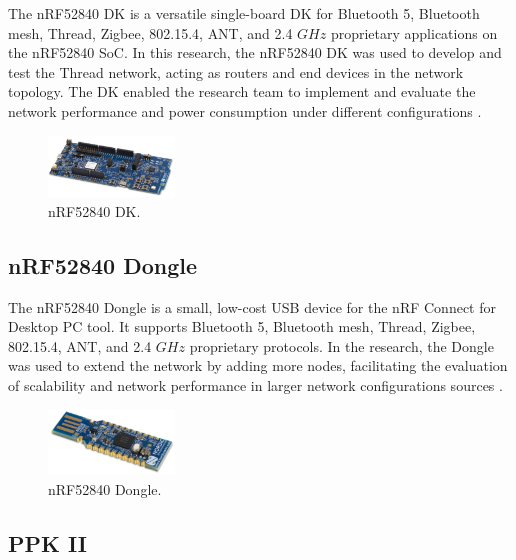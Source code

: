 The nRF52840 \gls{DK} is a versatile single-board \acrlong{DK} for Bluetooth 5, Bluetooth mesh, Thread, Zigbee, 802.15.4, \gls{ANT}, and 2.4 $GHz$ proprietary applications on the nRF52840 \gls{SoC}. In this research, the nRF52840 \gls{DK} was used to develop and test the Thread network, acting as routers and end devices in the network topology. The \acrlong{DK} enabled the research team to implement and evaluate the network performance and power consumption under different configurations \cite{Semiconductor_Nordic_Product_Brief_2018_2.0}.

\begin{figure}[H]
    \centering
    \includegraphics[width=0.3\textwidth]{images/situational_theoretical_analysis/nRF52840_DK.png}
    \caption{\gls{nRF}52840 \gls{DK}.}
    \label{fig:nRF52840_DK}
\end{figure}

\subsection{nRF52840 Dongle}

The \gls{nRF}52840 Dongle is a small, low-cost \gls{USB} device for the \gls{nRF} Connect for Desktop \gls{PC} tool. It supports Bluetooth 5, Bluetooth mesh, Thread, Zigbee, 802.15.4, \gls{ANT}, and 2.4 $GHz$ proprietary protocols. In the research, the Dongle was used to extend the network by adding more nodes, facilitating the evaluation of scalability and network performance in larger network configurations sources \cite{Semiconductor_Nordic_Dongle_Brief_2018_2.0}.

\begin{figure}[H]
    \centering
    \includegraphics[width=0.3\textwidth]{images/situational_theoretical_analysis/nRF52840_Dongle.png}
    \caption{\gls{nRF}52840 Dongle.}
    \label{fig:nRF52840_dongle}
\end{figure}

\subsection{\texorpdfstring{\acrlong{PPK}}{PPK} II}

